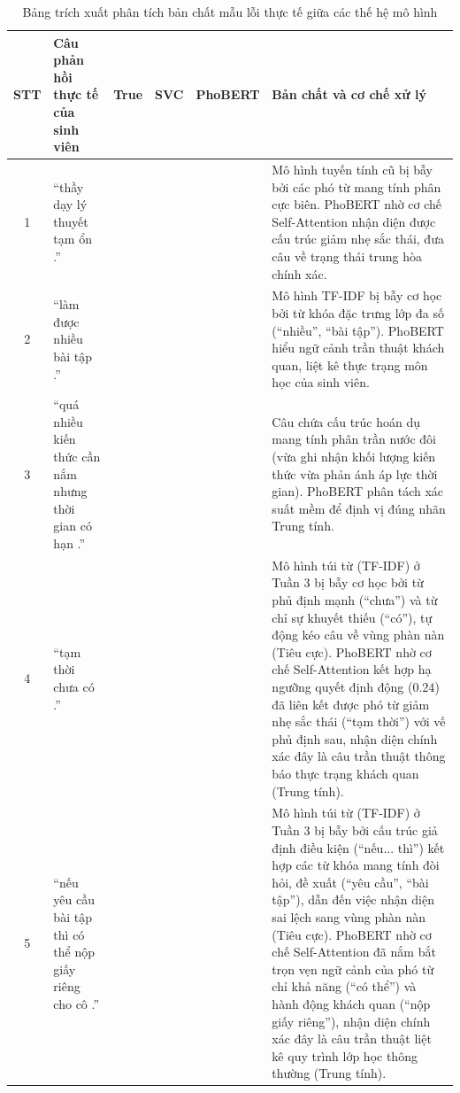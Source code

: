 \documentclass[conference,10pt,a4paper]{IEEEtran}
\begin{document}
\begin{table}[t]
\centering
\caption{Bảng trích xuất phân tích bản chất mẫu lỗi thực tế giữa các thế hệ mô hình}
\vspace{0.15cm}
\small
\renewcommand{\arraystretch}{1.3}
\begin{tabularx}{\textwidth}{|c|p{4.2cm}|>{\centering\arraybackslash}c|>{\centering\arraybackslash}c|>{\centering\arraybackslash}c|X|}
\hline
\textbf{STT} & \textbf{Câu phản hồi thực tế của sinh viên} & \textbf{True} & \textbf{SVC} & \textbf{PhoBERT} & \textbf{Bản chất và cơ chế xử lý} \\
\hline
1 & ``thầy dạy lý thuyết tạm ổn .'' & 1 & 0 & 1 & Mô hình tuyến tính cũ bị bẫy bởi các phó từ mang tính phân cực biên. PhoBERT nhờ cơ chế Self-Attention nhận diện được cấu trúc giảm nhẹ sắc thái, đưa câu về trạng thái trung hòa chính xác. \\
\hline
2 & ``làm được nhiều bài tập .'' & 1 & 2 & 1 & Mô hình TF-IDF bị bẫy cơ học bởi từ khóa đặc trưng lớp đa số (``nhiều'', ``bài tập''). PhoBERT hiểu ngữ cảnh trần thuật khách quan, liệt kê thực trạng môn học của sinh viên. \\
\hline
3 & ``quá nhiều kiến thức cần nắm nhưng thời gian có hạn .'' & 1 & 2 & 1 & Câu chứa cấu trúc hoán dụ mang tính phân trần nước đôi (vừa ghi nhận khối lượng kiến thức vừa phản ánh áp lực thời gian). PhoBERT phân tách xác suất mềm để định vị đúng nhãn Trung tính. \\
\hline
4 & ``tạm thời chưa có .'' & 1 & 0 & 1 & Mô hình túi từ (TF-IDF) ở Tuần 3 bị bẫy cơ học bởi từ phủ định mạnh (``chưa'') và từ chỉ sự khuyết thiếu (``có''), tự động kéo câu về vùng phàn nàn (Tiêu cực). PhoBERT nhờ cơ chế Self-Attention kết hợp hạ ngưỡng quyết định động ($0.24$) đã liên kết được phó từ giảm nhẹ sắc thái (``tạm thời'') với vế phủ định sau, nhận diện chính xác đây là câu trần thuật thông báo thực trạng khách quan (Trung tính). \\
\hline
5 & ``nếu yêu cầu bài tập thì có thể nộp giấy riêng cho cô .'' & 1 & 0 & 1 & Mô hình túi từ (TF-IDF) ở Tuần 3 bị bẫy bởi cấu trúc giả định điều kiện (``nếu... thì'') kết hợp các từ khóa mang tính đòi hỏi, đề xuất (``yêu cầu'', ``bài tập''), dẫn đến việc nhận diện sai lệch sang vùng phàn nàn (Tiêu cực). PhoBERT nhờ cơ chế Self-Attention đã nắm bắt trọn vẹn ngữ cảnh của phó từ chỉ khả năng (``có thể'') và hành động khách quan (``nộp giấy riêng''), nhận diện chính xác đây là câu trần thuật liệt kê quy trình lớp học thông thường (Trung tính). \\
\hline
\end{tabularx}
\end{table}
\end{document}
